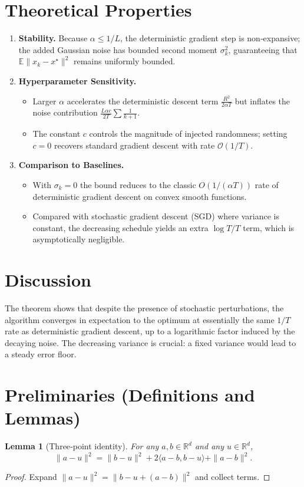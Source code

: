 \documentclass{article}
\newtheorem{lemma}{Lemma}
\newcommand{\E}{\mathbb{E}}
\newcommand{\R}{\mathbb{R}}
\begin{document}
\section*{Theoretical Properties}
\begin{enumerate}[label=\arabic*.]
\item \textbf{Stability.} Because $\alpha\le 1/L$, the deterministic gradient step is non‑expansive; the added Gaussian noise has bounded second moment $\sigma_{k}^{2}$, guaranteeing that $\E\|x_{k}-x^{\star}\|^{2}$ remains uniformly bounded.
\item \textbf{Hyperparameter Sensitivity.}
    \begin{itemize}
        \item Larger $\alpha$ accelerates the deterministic descent term $\frac{R^{2}}{2\alpha T}$ but inflates the noise contribution $\frac{L\alpha c}{2T}\sum\frac1{k+1}$.
        \item The constant $c$ controls the magnitude of injected randomness; setting $c=0$ recovers standard gradient descent with rate $\mathcal O(1/T)$.
    \end{itemize}
\item \textbf{Comparison to Baselines.}
    \begin{itemize}
        \item With $\sigma_{k}=0$ the bound reduces to the classic $O(1/(\alpha T))$ rate of deterministic gradient descent on convex smooth functions.
        \item Compared with stochastic gradient descent (SGD) where variance is constant, the decreasing schedule yields an extra $\log T/T$ term, which is asymptotically negligible.
    \end{itemize}
\end{enumerate}

\section*{Discussion}
The theorem shows that despite the presence of stochastic perturbations, the algorithm converges in expectation to the optimum at essentially the same $1/T$ rate as deterministic gradient descent, up to a logarithmic factor induced by the decaying noise. The decreasing variance is crucial: a fixed variance would lead to a steady error floor.

\section*{Preliminaries (Definitions and Lemmas)}
\begin{lemma}[Three‑point identity]\label{lem:three}
For any $a,b\in\R^{d}$ and any $u\in\R^{d}$,
\[
\|a-u\|^{2}= \|b-u\|^{2}+2\langle a-b,b-u\rangle+\|a-b\|^{2}.
\]
\end{lemma}
\begin{proof}
Expand $\|a-u\|^{2}=\|b-u+(a-b)\|^{2}$ and collect terms. \qedhere
\end{proof}
\end{document}
